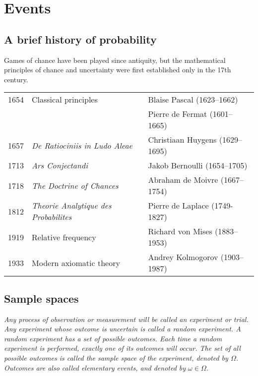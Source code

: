 \chapter{Events}\label{chap:events}

\section*{A brief history of probability}
Games of chance have been played since antiquity, but the mathematical principles of chance and uncertainty were first established only in the 17th century.

\vspace*{4ex}
\begin{tabular}{lll}
1654		& Classical principles 	& Blaise Pascal (1623--1662) \\
    		&						& Pierre de Fermat (1601--1665)  \\
1657		& \textit{De Ratiociniis in Ludo Aleae} & Christiaan Huygens (1629--1695) \\
1713		& \textit{Ars Conjectandi} & Jakob Bernoulli (1654--1705) \\ 
1718		& \textit{The Doctrine of Chances} & Abraham de Moivre (1667--1754) \\
1812		& \textit{Theorie Analytique des Probabilites} & Pierre de Laplace (1749-1827) \\
1919		& Relative frequency & Richard von Mises (1883--1953) \\
1933		& Modern axiomatic theory & Andrey Kolmogorov (1903--1987)\\
\end{tabular}

\section{Sample spaces}
\begin{definition}
\ben
\it
Any process of observation or measurement will be called an \emph{experiment} or \emph{trial}.
\it
Any experiment whose outcome is uncertain is called a \emph{random experiment}.
\it
A random experiment has a set of possible \emph{outcomes}.
\it
Each time a random experiment is performed, \emph{exactly one} of its outcomes will occur.
\it
The set of all possible outcomes is called the \emph{sample space} of the experiment, denoted by $\Omega$.
\it
Outcomes are also called \emph{elementary events}, and denoted by $\omega\in\Omega$.
\een
\end{definition}


